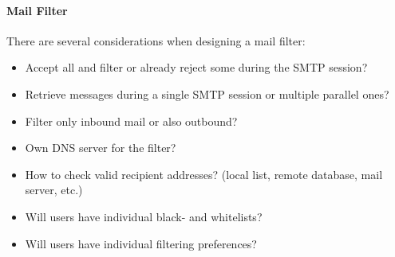 \paragraph{Mail Filter}
There are several considerations when designing a mail filter:

\begin{itemize}
    \item Accept all and filter or already reject some during the SMTP session?
    \item Retrieve messages during a single SMTP session or multiple parallel ones?
    \item Filter only inbound mail or also outbound?
    \item Own DNS server for the filter?
    \item How to check valid recipient addresses? (local list, remote database, mail server, etc.)
    \item Will users have individual black- and whitelists?
    \item Will users have individual filtering preferences?
\end{itemize}